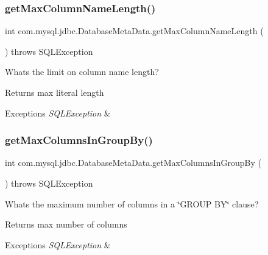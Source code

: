 \subsubsection{\texorpdfstring{get\+Max\+Column\+Name\+Length()}{getMaxColumnNameLength()}}
{\footnotesize\ttfamily int com.\+mysql.\+jdbc.\+Database\+Meta\+Data.\+get\+Max\+Column\+Name\+Length (\begin{DoxyParamCaption}{ }\end{DoxyParamCaption}) throws S\+Q\+L\+Exception}

What\textquotesingle{}s the limit on column name length?

\begin{DoxyReturn}{Returns}
max literal length 
\end{DoxyReturn}

\begin{DoxyExceptions}{Exceptions}
{\em S\+Q\+L\+Exception} & \\
\hline
\end{DoxyExceptions}
\mbox{\label{classcom_1_1mysql_1_1jdbc_1_1_database_meta_data_a5eca1d6e17be8537a3c2319c7b384a43}} 
\subsubsection{\texorpdfstring{get\+Max\+Columns\+In\+Group\+By()}{getMaxColumnsInGroupBy()}}
{\footnotesize\ttfamily int com.\+mysql.\+jdbc.\+Database\+Meta\+Data.\+get\+Max\+Columns\+In\+Group\+By (\begin{DoxyParamCaption}{ }\end{DoxyParamCaption}) throws S\+Q\+L\+Exception}

What\textquotesingle{}s the maximum number of columns in a \char`\"{}\+G\+R\+O\+U\+P B\+Y\char`\"{} clause?

\begin{DoxyReturn}{Returns}
max number of columns 
\end{DoxyReturn}

\begin{DoxyExceptions}{Exceptions}
{\em S\+Q\+L\+Exception} & \\
\hline
\end{DoxyExceptions}
\mbox{\label{classcom_1_1mysql_1_1jdbc_1_1_database_meta_data_acf1c7ff363547d4f88471c8bdd42505d}} 

